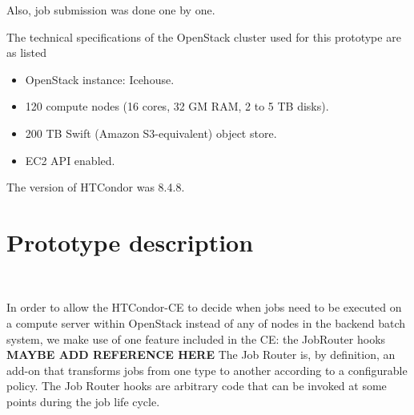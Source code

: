 \documentclass[a4paper]{jpconf}
\begin{document}
Also, job submission was done one by one.

The technical specifications of the OpenStack cluster used for this prototype are as listed 

\begin{itemize}
\item OpenStack instance: Icehouse.
\item 120 compute nodes (16 cores, 32 GM RAM, 2 to 5 TB disks).
\item 200 TB Swift (Amazon S3-equivalent) object store.
\item EC2 API enabled.
\end{itemize}

The version of HTCondor was 8.4.8.

\section{Prototype description}

~

In order to allow the HTCondor-CE to decide when jobs need to be executed on a
compute server within OpenStack instead of any of nodes in the backend batch
system, we make use of one feature included in the CE: the JobRouter hooks \textbf{MAYBE ADD REFERENCE HERE} \newline
The Job Router is, by definition, an add-on that transforms jobs from one type to
another according to a configurable policy.
The Job Router hooks are arbitrary code that can be invoked at some points during the job life cycle.

\end{document}
